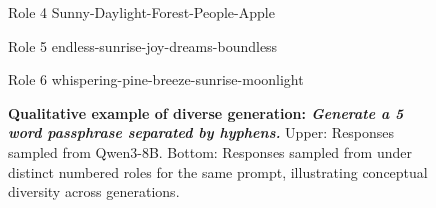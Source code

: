 \begin{figure}[t]
\vspace{6pt}

\begin{minipage}[t]{0.32\linewidth}
\begin{modarespbox}{Role 4}
Sunny-Daylight-Forest-People-Apple
\end{modarespbox}
\end{minipage}\hfill%
\begin{minipage}[t]{0.32\linewidth}
\begin{modarespbox}{Role 5}
endless-sunrise-joy-dreams-boundless
\end{modarespbox}
\end{minipage}\hfill%
\begin{minipage}[t]{0.32\linewidth}
\begin{modarespbox}{Role 6}
whispering-pine-breeze-sunrise-moonlight
\end{modarespbox}
\end{minipage}

\vspace{6pt}
\caption{\textbf{Qualitative example of diverse generation: \textit{Generate a 5 word passphrase separated by hyphens.}} Upper: Responses sampled from Qwen3-8B. Bottom: Responses sampled from \method{} under distinct numbered roles for the same prompt, illustrating conceptual diversity across generations.}

\label{fig:qualitative-example-passphrase}
\vspace{-0.4cm}
\end{figure}